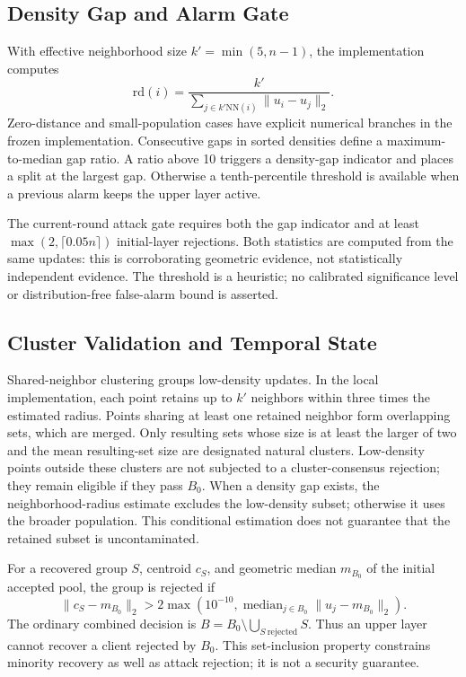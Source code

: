 \documentclass[journal]{IEEEtran}
\newcommand{\rd}{\mathrm{rd}}
\begin{document}
\subsection{Density Gap and Alarm Gate}
With effective neighborhood size $k' = \min(5,n-1)$, the implementation computes
\begin{equation}
\rd(i)=\frac{k'}{\sum_{j\in k'\mathrm{NN}(i)}\|u_i-u_j\|_2}.
\end{equation}
Zero-distance and small-population cases have explicit numerical branches in the frozen implementation. Consecutive gaps in sorted densities define a maximum-to-median gap ratio. A ratio above 10 triggers a density-gap indicator and places a split at the largest gap. Otherwise a tenth-percentile threshold is available when a previous alarm keeps the upper layer active.

The current-round attack gate requires both the gap indicator and at least $\max(2,\lceil0.05n\rceil)$ initial-layer rejections. Both statistics are computed from the same updates: this is corroborating geometric evidence, not statistically independent evidence. The threshold is a heuristic; no calibrated significance level or distribution-free false-alarm bound is asserted.

\subsection{Cluster Validation and Temporal State}
Shared-neighbor clustering groups low-density updates. In the local implementation, each point retains up to $k'$ neighbors within three times the estimated radius. Points sharing at least one retained neighbor form overlapping sets, which are merged. Only resulting sets whose size is at least the larger of two and the mean resulting-set size are designated natural clusters. Low-density points outside these clusters are not subjected to a cluster-consensus rejection; they remain eligible if they pass $B_0$. When a density gap exists, the neighborhood-radius estimate excludes the low-density subset; otherwise it uses the broader population. This conditional estimation does not guarantee that the retained subset is uncontaminated.

For a recovered group $S$, centroid $c_S$, and geometric median $m_{B_0}$ of the initial accepted pool, the group is rejected if
\begin{equation}
 \|c_S-m_{B_0}\|_2>2\max\!\left(10^{-10},\operatorname{median}_{j\in B_0}\|u_j-m_{B_0}\|_2\right).
\end{equation}
The ordinary combined decision is $B=B_0\setminus\bigcup_{S\mathrm{\ rejected}}S$. Thus an upper layer cannot recover a client rejected by $B_0$. This set-inclusion property constrains minority recovery as well as attack rejection; it is not a security guarantee.
\end{document}
